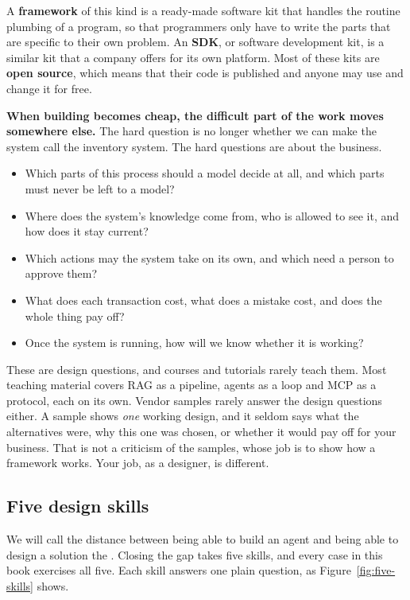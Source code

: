 A \textbf{framework} of this kind is a ready-made software kit that handles the routine plumbing of a program, so that programmers only have to write the parts that are specific to their own problem. An \textbf{SDK}, or software development kit, is a similar kit that a company offers for its own platform. Most of these kits are \textbf{open source}, which means that their code is published and anyone may use and change it for free.


\textbf{When building becomes cheap, the difficult part of the work moves somewhere else.} The hard question is no longer whether we can make the system call the inventory system. The hard questions are about the business. 
\begin{itemize}
\item Which parts of this process should a model decide at all, and which parts must never be left to a model? 
\item Where does the system's knowledge come from, who is allowed to see it, and how does it stay current? 
\item Which actions may the system take on its own, and which need a person to approve them? 
\item What does each transaction cost, what does a mistake cost, and does the whole thing pay off? 
\item Once the system is running, how will we know whether it is working?
\end{itemize}

These are design questions, and courses and tutorials rarely teach them. Most teaching material covers RAG as a pipeline, agents as a loop and MCP as a protocol, each on its own. Vendor samples rarely answer the design questions either. A sample shows \emph{one} working design, and it seldom says what the alternatives were, why this one was chosen, or whether it would pay off for your business. That is not a criticism of the samples, whose job is to show how a framework works. Your job, as a designer, is different.

\subsection{Five design skills}

We will call the distance between being able to build an agent and being able to design a solution the . Closing the gap takes five skills, and every case in this book exercises all five. Each skill answers one plain question, as Figure~\ref{fig:five-skills} shows.


